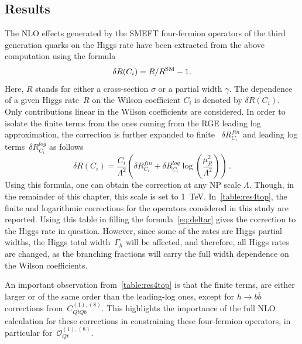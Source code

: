 	\subsection{Results}
\par The NLO effects generated by the SMEFT four-fermion operators of the third generation quarks on the Higgs rate have been extracted from the above computation using the formula
	\begin{equation}
		\delta R(C_i) = R/R^{\mathrm{SM}} -1.
		\label{eq:deltaR}
	\end{equation}
	Here, $R$ stands for either a cross-section $\sigma$ or a partial width $\gamma$. The dependence of a given Higgs rate~$R$ on the Wilson coefficient $C_i$ is denoted by $\delta R(C_i) $.  Only contributions linear in the Wilson coefficients are considered. In order to isolate the finite terms from the ones coming from the RGE leading log approximation, the correction is further expanded to finite ~$\delta R_{C_i}^{fin}$ and leading log terms~$\delta R_{C_i}^{log}$ as follows
	\begin{equation}
		\delta R(C_i)= \frac{C_i}{\Lambda^2}\left(\delta R_{C_i}^{fin}+ \delta R_{C_i}^{log} \log\left(\frac{\mu_R^2}{\Lambda^2}\right)\right)\,.
		\label{eq:deltar}
	\end{equation}
	Using this formula, one can obtain the correction at any NP scale $\Lambda$. Though, in the remainder of this chapter, this scale is set to \SI{1}{TeV}. In~\autoref{table:res4top}, the finite and logarithmic corrections for the operators considered in this study are reported. Using this table in filling the formula~\eqref{eq:deltar} gives the correction to the Higgs rate in question.  However, since some of the rates are Higgs partial widths, the Higgs total width~$\Gamma_h$ will be affected, and therefore, all Higgs rates are changed, as the branching fractions will carry the full width dependence on the Wilson coefficients.
\par 	An important observation from~\autoref{table:res4top} is that the finite terms, are either larger or of the same order than the leading-log ones, except for $h\to b\bar{b}$ corrections from~$C_{QtQb}^{(1),(8)}$. This highlights the importance of the full NLO calculation for these corrections in constraining these four-fermion operators, in particular for~$\mathcal O_{Qt}^{(1),(8)}$.
	

